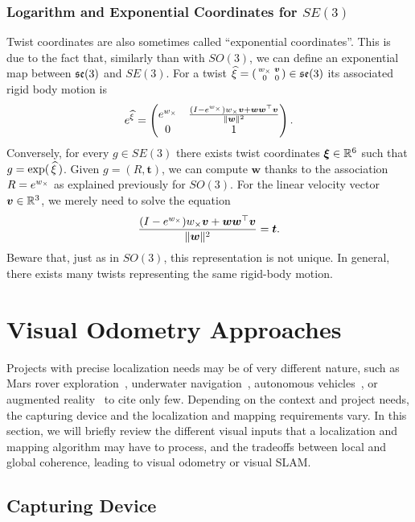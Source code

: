 \subsubsection{Logarithm and Exponential Coordinates for $SE(3)$}%
\label{ssub:exponential_coordinates_for_se_3}

Twist coordinates are also sometimes called ``exponential coordinates''.
This is due to the fact that, similarly than with $SO(3)$,
we can define an exponential map between $\mathfrak{se}(3)$ and $SE(3)$.
For a twist $\widehat{\xi} = \left(\begin{smallmatrix} {w}_{\times} & \bm{v} \\0 & 0 \end{smallmatrix} \right) \in \mathfrak{se}(3)$
its associated rigid body motion is
\[
	e^{\widehat{\xi}} =
	\begin{pmatrix}
		e^{{w}_{\times}}
			& \frac{(I-e^{{w}_{\times}}) {w}_{\times} \bm{v}
				+ \bm{w}\bm{w}^{\top}\bm{v}}{\|\bm{w}\|^2}
			\\
		0 & 1
	\end{pmatrix}.
\]
Conversely, for every $g \in SE(3)$ there exists
twist coordinates $\bm{\xi} \in \mathbb{R}^6$ such that $g=\exp(\,\widehat{\xi}\,)$.
Given $g = (R,\bm{t})$, we can compute $\bm{w}$ thanks to the association
$R = e^{{w}_{\times}}$ as explained previously for $SO(3)$.
For the linear velocity vector $\bm{v} \in \mathbb{R}^3$,
we merely need to solve the equation
\[
	\frac{(I-e^{{w}_{\times}}) {w}_{\times} \bm{v}
		+ \bm{w}\bm{w}^{\top}\bm{v}}{\|\bm{w}\|^2}
	= \bm{t}.
\]
Beware that, just as in $SO(3)$, this representation is not unique.
In general, there exists many twists representing the same rigid-body motion.


\section{Visual Odometry Approaches}%
\label{sec:visual-odometry-approaches}

Projects with precise localization needs may be of very different nature,
such as Mars rover exploration~\cite{maimone2007two},
underwater navigation~\cite{dunbabin2005hybrid},
autonomous vehicles~\cite{bertozzi2011viac},
or augmented reality~\cite{schops2014semi} to cite only few.
Depending on the context and project needs,
the capturing device and the localization and mapping requirements vary.
In this section, we will briefly review the different visual inputs
that a localization and mapping algorithm may have to process,
and the tradeoffs between local and global coherence,
leading to visual odometry or visual SLAM.\@

\subsection{Capturing Device}%
\label{sub:capturing-device}

